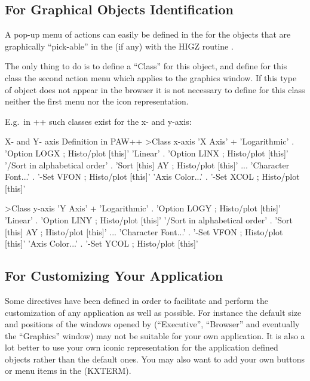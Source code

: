 \subsection{For Graphical Objects Identification}
\label{ref:regraph1}

A pop-up menu of actions can easily be defined in the \CDF{} for the objects
that are graphically ``pick-able'' in the \GW{} (if any) 
with the HIGZ routine \IGOBJ{} \cite{bib-HIGZ}.

The only thing to do is to define a ``Class'' for this object, and 
define for this class the second action menu which applies to the graphics
window. If this type of object does not appear in the browser it is
not necessary to define for this class neither the first menu nor the icon
representation. 

E.g.\ in \PAW++{} such classes exist for the x- and y-axis:

\begin{XMPt} {X- and Y- axis Definition in PAW++ \CDF{}}
>Class x-axis 'X Axis'
+
'Logarithmic'                          . 'Option LOGX ; Histo/plot [this]'
'Linear'                               . 'Option LINX ; Histo/plot [this]'
'/Sort in alphabetical order'          . 'Sort [this] AY ; Histo/plot [this]'
...
'Character Font...'                    . '-Set VFON ; Histo/plot [this]'
'Axis Color...'                        . '-Set XCOL ; Histo/plot [this]'

>Class y-axis 'Y Axis'
+
'Logarithmic'                          . 'Option LOGY ; Histo/plot [this]'
'Linear'                               . 'Option LINY ; Histo/plot [this]'
'/Sort in alphabetical order'          . 'Sort [this] AY ; Histo/plot [this]'
...
'Character Font...'                    . '-Set VFON ; Histo/plot [this]'
'Axis Color...'                        . '-Set YCOL ; Histo/plot [this]'
\end{XMPt}


\subsection{For Customizing Your Application}
\label{ref:recustomize}

Some \CDF{} directives have been defined in order to facilitate and perform the 
customization of any application as well as possible. For instance the 
default size and positions of the windows opened by \KUIPMotif{} (``Executive'', 
``Browser'' and eventually the ``Graphics'' window) may not be 
suitable for your own application. It is also a lot better to use your own
iconic representation for the application defined objects rather than
the default ones. You may also want to add your own buttons or menu items
in the \EW{} (KXTERM).

